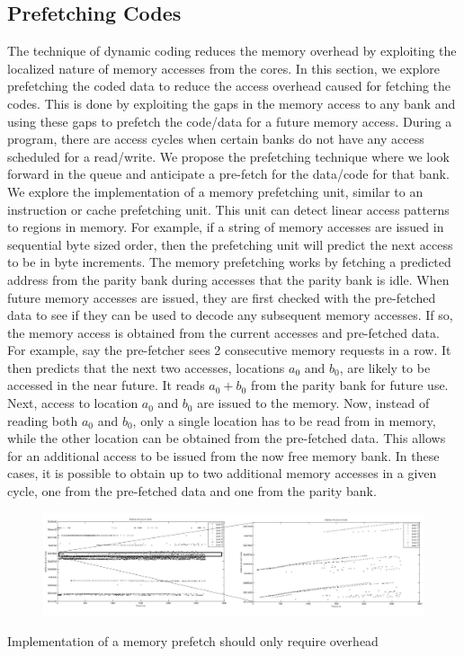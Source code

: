 \subsection{Prefetching Codes}
\label{sec:prefetching}
The technique of dynamic coding reduces the memory overhead by exploiting the 
localized nature of memory accesses from the cores. In this section, we explore 
prefetching the coded data to reduce the access overhead caused for fetching the 
codes. This is done by exploiting the gaps in the memory access to any bank and 
using these gaps to prefetch the code/data for a future memory access. During a 
program, there are access cycles when certain banks do not have any access 
scheduled for a read/write. We propose the prefetching technique where we look 
forward in the queue and anticipate a pre-fetch for the data/code for that bank.  
We explore the implementation of a memory prefetching unit, similar to an 
instruction or cache prefetching unit. This unit can detect linear access 
patterns to regions in memory.  For example, if a string of memory accesses are 
issued in sequential byte sized order, then the prefetching unit will predict 
the next access to be in byte increments. The memory prefetching works by 
fetching a predicted address from the parity bank during accesses that the 
parity bank is idle. When future memory accesses are issued, they are first 
checked with the pre-fetched data to see if they can be used to decode any 
subsequent memory accesses. If so, the memory access is obtained from the 
current accesses and pre-fetched data. For example, say the pre-fetcher sees 2 
consecutive memory requests in a row. It then predicts that the next two 
accesses, locations $a_0$ and $b_0$, are likely to be accessed in the near 
future. It reads $a_0+b_0$ from the parity bank for future use. Next, access to 
location $a_0$ and $b_0$ are issued to the memory. Now, instead of reading both 
$a_0$ and $b_0$, only a single location has to be read from in memory, while the 
other location can be obtained from the pre-fetched data. This allows for an 
additional access to be issued from the now free memory bank.  In these cases, 
it is possible to obtain up to two additional memory accesses in a given cycle, 
one from the pre-fetched data and one from the parity bank.
\begin{figure}[htbp]
\centering
\includegraphics[width=0.5\linewidth]{fig/bank_access1.jpg}
\caption{ }
\label{fig:bank_access1}
\end{figure} Implementation of a memory prefetch should only require overhead 
